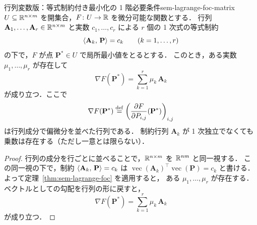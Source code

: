 \begin{theorem}{行列変数版：等式制約付き最小化の 1 階必要条件}{sem-lagrange-foc-matrix}
  $U \subseteq \mathbb{R}^{n\times m}$ を開集合，$F \colon U \to \mathbb{R}$ を微分可能な関数とする．
  行列 $\mathbf{A}_1,\dots,\mathbf{A}_r \in \mathbb{R}^{n\times m}$ と実数 $c_1,\dots,c_r$ による
  $r$ 個の 1 次式の等式制約
  \[
    \langle \mathbf{A}_k,\, \mathbf{P} \rangle = c_k
    \qquad (k=1,\dots,r)
  \]
  の下で，$F$ が点 $\mathbf{P}^* \in U$ で局所最小値をとるとする．
  このとき，ある実数 $\mu_1,\dots,\mu_r$ が存在して
  \[
    \nabla F(\mathbf{P}^*) = \sum_{k=1}^{r}\mu_k\,\mathbf{A}_k
  \]
  が成り立つ．ここで
  \[
    \nabla F(\mathbf{P}^*)
    \overset{\mathrm{def}}{=}
    \left(\frac{\partial F}{\partial P_{i,j}}(\mathbf{P}^*)\right)_{i,j}
  \]
  は行列成分で偏微分を並べた行列である．
  制約行列 $\mathbf{A}_k$ が 1 次独立でなくても乗数は存在する（ただし一意とは限らない）．
\end{theorem}

\begin{proof}
  行列の成分を行ごとに並べることで，$\mathbb{R}^{n\times m}$ を $\mathbb{R}^{nm}$ と同一視する．
  この同一視の下で，制約
  $\langle \mathbf{A}_k,\, \mathbf{P} \rangle=c_k$ は
  $\operatorname{vec}(\mathbf{A}_k)^\top\operatorname{vec}(\mathbf{P})=c_k$ と書ける．
  よって定理~\ref{thm:sem-lagrange-foc} を適用すると，
  ある $\mu_1,\dots,\mu_r$ が存在する．
  ベクトルとしての勾配を行列の形に戻すと，
  \[
    \nabla F(\mathbf{P}^*) = \sum_{k=1}^{r}\mu_k\,\mathbf{A}_k
  \]
  が成り立つ．
\end{proof}
